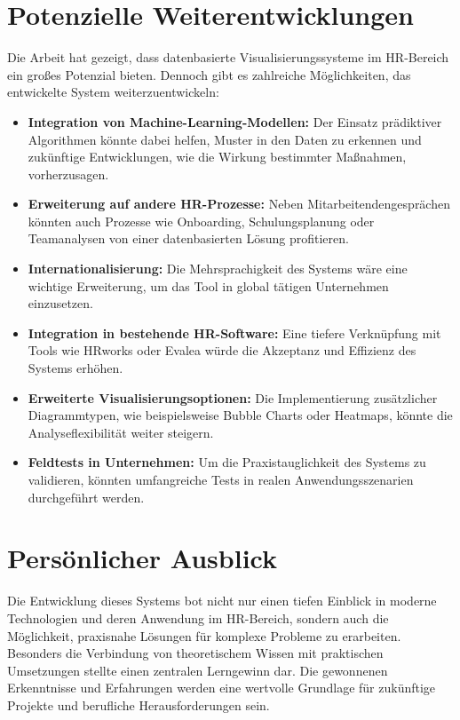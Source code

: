 \section{Potenzielle Weiterentwicklungen} Die Arbeit hat gezeigt, dass datenbasierte Visualisierungssysteme im HR-Bereich ein großes Potenzial bieten. Dennoch gibt es zahlreiche Möglichkeiten, das entwickelte System weiterzuentwickeln: \begin{itemize} \item \textbf{Integration von Machine-Learning-Modellen:} Der Einsatz prädiktiver Algorithmen könnte dabei helfen, Muster in den Daten zu erkennen und zukünftige Entwicklungen, wie die Wirkung bestimmter Maßnahmen, vorherzusagen. \item \textbf{Erweiterung auf andere HR-Prozesse:} Neben Mitarbeitendengesprächen könnten auch Prozesse wie Onboarding, Schulungsplanung oder Teamanalysen von einer datenbasierten Lösung profitieren. \item \textbf{Internationalisierung:} Die Mehrsprachigkeit des Systems wäre eine wichtige Erweiterung, um das Tool in global tätigen Unternehmen einzusetzen. \item \textbf{Integration in bestehende HR-Software:} Eine tiefere Verknüpfung mit Tools wie HRworks oder Evalea würde die Akzeptanz und Effizienz des Systems erhöhen. \item \textbf{Erweiterte Visualisierungsoptionen:} Die Implementierung zusätzlicher Diagrammtypen, wie beispielsweise Bubble Charts oder Heatmaps, könnte die Analyseflexibilität weiter steigern. \item \textbf{Feldtests in Unternehmen:} Um die Praxistauglichkeit des Systems zu validieren, könnten umfangreiche Tests in realen Anwendungsszenarien durchgeführt werden. \end{itemize}

\section{Persönlicher Ausblick} Die Entwicklung dieses Systems bot nicht nur einen tiefen Einblick in moderne Technologien und deren Anwendung im HR-Bereich, sondern auch die Möglichkeit, praxisnahe Lösungen für komplexe Probleme zu erarbeiten. Besonders die Verbindung von theoretischem Wissen mit praktischen Umsetzungen stellte einen zentralen Lerngewinn dar. Die gewonnenen Erkenntnisse und Erfahrungen werden eine wertvolle Grundlage für zukünftige Projekte und berufliche Herausforderungen sein.

